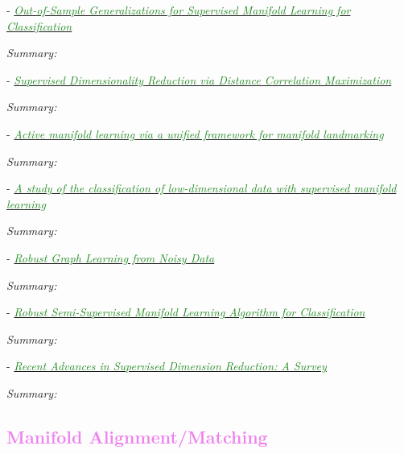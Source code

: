 \documentclass[]{article}
\newcommand{\paperentry}[4]{
            \hangindent=1cm
            \textcolor{red}{\cite{#1}} - \href{run:../References/#3}{\textcolor{ForestGreen}{\textit{#2}}}
            
            \noindent            
            \begin{minipage}[t]{0.1\linewidth}\hfill\end{minipage}
            \begin{minipage}[t]{0.8\linewidth}\textcolor{NavyBlue}{{\textit{Summary:}}}#4\end{minipage}
            \vspace{.25cm}
          }
\begin{document}
	\paperentry{Vural2016OutOfSampleSupManifoldLearning}
	{Out-of-Sample Generalizations for Supervised Manifold Learning for Classification}
	{Manifold_Representation_Learning/Supervised/Vural2016OutOfSampleSupManifoldLearning.pdf}
	{}
	
	
	\paperentry{Vepakomma2016SupDimRedDistanceCorrelationMax}
	{Supervised Dimensionality Reduction via Distance Correlation Maximization}
	{Manifold_Representation_Learning/Supervised/Vepakomma2016SupDimRedDistanceCorrelationMax.pdf}
	{}
	
	\paperentry{Xu2017ActiveManifoldLearning}
	{Active manifold learning via a unified framework for manifold landmarking}
	{Manifold_Representation_Learning/Supervised/Xu2017ActiveManifoldLearning.pdf}
	{}
	
	\paperentry{Vural2018StudySupervisedManifoldLearning}
	{A study of the classification of low-dimensional data with supervised manifold learning}
	{Manifold_Representation_Learning/Supervised/Vural2018StudySupervisedManifoldLearning.pdf}
	{}
	
	
	\paperentry{Kang2018ManifoldRegularizedPCA}
	{Robust Graph Learning from Noisy Data}
	{Manifold_Representation_Learning/Supervised/Kang2018ManifoldRegularizedPCA.pdf}
	{}
	

	\paperentry{Chen2018RobustSemiSupManifoldLearning}
	{Robust Semi-Supervised Manifold Learning Algorithm for Classification}
	{Manifold_Representation_Learning/Supervised/Chen2018RobustSemiSupManifoldLearning.pdf}
	{}
	
	\paperentry{Chao2019RecentAdvancesSupervisedDimRed}
	{Recent Advances in Supervised Dimension Reduction: A Survey}
	{Manifold_Representation_Learning/Supervised/Chao2019RecentAdvancesSupervisedDimRed.pdf}
	{}
	
	
	\textcolor{Violet}{\subsection{Manifold Alignment/Matching}}
	
\end{document}
